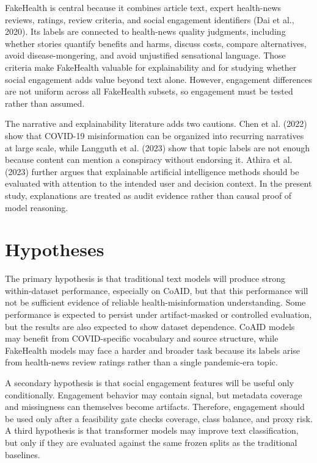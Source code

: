 \documentclass[12pt]{article}
\begin{document}
FakeHealth is central because it combines article text, expert health-news reviews, ratings, review criteria, and social engagement identifiers (Dai et al., 2020). Its labels are connected to health-news quality judgments, including whether stories quantify benefits and harms, discuss costs, compare alternatives, avoid disease-mongering, and avoid unjustified sensational language. Those criteria make FakeHealth valuable for explainability and for studying whether social engagement adds value beyond text alone. However, engagement differences are not uniform across all FakeHealth subsets, so engagement must be tested rather than assumed.

The narrative and explainability literature adds two cautions. Chen et al. (2022) show that COVID-19 misinformation can be organized into recurring narratives at large scale, while Langguth et al. (2023) show that topic labels are not enough because content can mention a conspiracy without endorsing it. Athira et al. (2023) further argues that explainable artificial intelligence methods should be evaluated with attention to the intended user and decision context. In the present study, explanations are treated as audit evidence rather than causal proof of model reasoning.

\section*{Hypotheses}

The primary hypothesis is that traditional text models will produce strong within-dataset performance, especially on CoAID, but that this performance will not be sufficient evidence of reliable health-misinformation understanding. Some performance is expected to persist under artifact-masked or controlled evaluation, but the results are also expected to show dataset dependence. CoAID models may benefit from COVID-specific vocabulary and source structure, while FakeHealth models may face a harder and broader task because its labels arise from health-news review ratings rather than a single pandemic-era topic.

A secondary hypothesis is that social engagement features will be useful only conditionally. Engagement behavior may contain signal, but metadata coverage and missingness can themselves become artifacts. Therefore, engagement should be used only after a feasibility gate checks coverage, class balance, and proxy risk. A third hypothesis is that transformer models may improve text classification, but only if they are evaluated against the same frozen splits as the traditional baselines.
\end{document}
